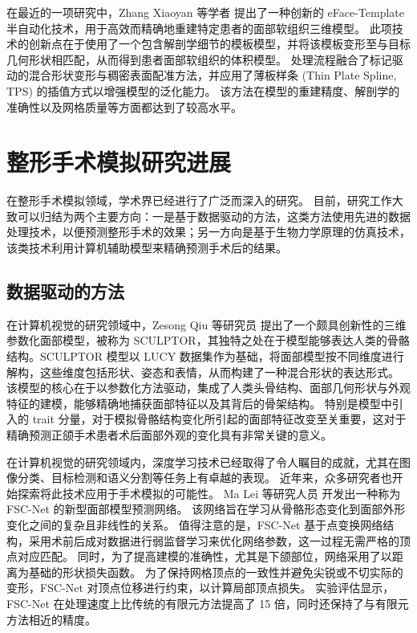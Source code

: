 在最近的一项研究中，Zhang Xiaoyan 等学者 \cite{zhangEFacetemplateMethodEfficiently2016} 提出了一种创新的 eFace-Template 半自动化技术，用于高效而精确地重建特定患者的面部软组织三维模型。
此项技术的创新点在于使用了一个包含解剖学细节的模板模型，并将该模板变形至与目标几何形状相匹配，从而得到患者面部软组织的体积模型。
处理流程融合了标记驱动的混合形状变形与稠密表面配准方法，并应用了薄板样条 (Thin Plate Spline, TPS) 的插值方式以增强模型的泛化能力。
该方法在模型的重建精度、解剖学的准确性以及网格质量等方面都达到了较高水平。

\section{整形手术模拟研究进展}

在整形手术模拟领域，学术界已经进行了广泛而深入的研究。
目前，研究工作大致可以归结为两个主要方向：一是基于数据驱动的方法，这类方法使用先进的数据处理技术，以便预测整形手术的效果；另一方向是基于生物力学原理的仿真技术，该类技术利用计算机辅助模型来精确预测手术后的结果。

\subsection{数据驱动的方法}

在计算机视觉的研究领域中，Zesong Qiu 等研究员 \cite{qiuSCULPTORSkeletonconsistentFace2022a} 提出了一个颇具创新性的三维参数化面部模型，被称为 SCULPTOR，其独特之处在于模型能够表达人类的骨骼结构。SCULPTOR 模型以 LUCY 数据集作为基础，将面部模型按不同维度进行解构，这些维度包括形状、姿态和表情，从而构建了一种混合形状的表达形式。
该模型的核心在于以参数化方法驱动，集成了人类头骨结构、面部几何形状与外观特征的建模，能够精确地捕获面部特征以及其背后的骨架结构。
特别是模型中引入的 trait 分量，对于模拟骨骼结构变化所引起的面部特征改变至关重要，这对于精确预测正颌手术患者术后面部外观的变化具有非常关键的意义。

在计算机视觉的研究领域内，深度学习技术已经取得了令人瞩目的成就，尤其在图像分类、目标检测和语义分割等任务上有卓越的表现。
近年来，众多研究者也开始探索将此技术应用于手术模拟的可能性。
Ma Lei 等研究人员 \cite{maSimulationPostoperativeFacial2023} 开发出一种称为 FSC-Net 的新型面部模型预测网络。
该网络旨在学习从骨骼形态变化到面部外形变化之间的复杂且非线性的关系。
值得注意的是，FSC-Net 基于点变换网络结构，采用术前后成对数据进行弱监督学习来优化网络参数，这一过程无需严格的顶点对应匹配。
同时，为了提高建模的准确性，尤其是下颌部位，网络采用了以距离为基础的形状损失函数。
为了保持网格顶点的一致性并避免尖锐或不切实际的变形，FSC-Net 对顶点位移进行约束，以计算局部顶点损失。
实验评估显示，FSC-Net 在处理速度上比传统的有限元方法提高了 15 倍，同时还保持了与有限元方法相近的精度。

